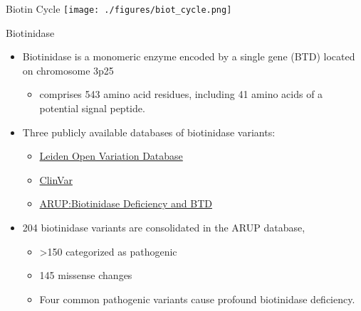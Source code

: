 \documentclass[presentation, smaller]{beamer}
\begin{document}
\begin{frame}[label={sec:orgheadline3}]{Biotin Cycle}
\texttt{[image: ./figures/biot\_cycle.png]}
\end{frame}


\begin{frame}[label={sec:orgheadline4}]{Biotinidase}
\begin{itemize}
\item Biotinidase is a monomeric enzyme encoded by a single gene (BTD) located on chromosome 3p25
\begin{itemize}
\item comprises 543 amino acid residues, including 41 amino acids of a potential signal peptide.
\end{itemize}

\item Three publicly available databases of biotinidase variants:
\begin{itemize}
\item \href{https://grenada.lumc.nl/LOVD2/shared1/home.php?select_db=BTD}{Leiden Open Variation Database}
\item \href{https://www.ncbi.nlm.nih.gov/clinvar/}{ClinVar}
\item \href{http://www.arup.utah.edu/database/BTD/BTD_welcome.php}{ARUP:Biotinidase Deficiency and BTD}
\end{itemize}

\item 204 biotinidase variants are consolidated in the ARUP database,
\begin{itemize}
\item >150 categorized as pathogenic
\item 145 missense changes
\item Four common pathogenic variants cause profound biotinidase deficiency.
\end{itemize}
\end{itemize}
\end{frame}
\end{document}
